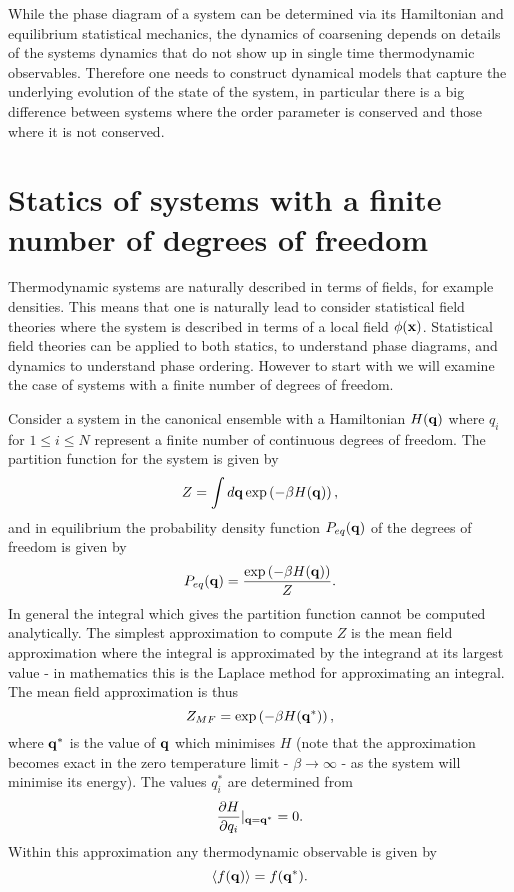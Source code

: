 \documentclass[11pt]{report}
\begin{document}
While the phase diagram of a system can be determined via 
its Hamiltonian and equilibrium statistical mechanics, the dynamics of coarsening depends on details of the systems dynamics that do not show up in single time thermodynamic observables. Therefore one needs to construct dynamical models that capture the underlying evolution of the state of the system, in particular there is a big difference between systems where the order parameter is conserved and those where it is not conserved.

\section{Statics of systems with a finite number of degrees of freedom}

Thermodynamic systems are naturally described in terms of fields, for example densities. This means that one is naturally lead to consider statistical field theories where the system is described in terms of a local field $\phi({\bf x})$. Statistical field theories can be applied to both statics, to understand phase diagrams, and dynamics to understand phase ordering. However to start with we will examine the case of systems with a finite number of degrees of freedom. 

Consider a system in the canonical ensemble with a Hamiltonian $H({\bf q})$ where $q_i$ for 
$1\leq i\leq N$ represent a finite number of continuous degrees of freedom. The partition function for the system is given by
\begin{equation}
Z = \int d{\bf q} \exp\left(-\beta H({\bf q})\right),
\end{equation}
and in equilibrium the probability density function $P_{eq}({\bf q})$ of the degrees of freedom is given by 
\begin{equation}
P_{eq}({\bf q}) = \frac{\exp\left(-\beta H({\bf q})\right)}{Z}.\label{eqdis}
\end{equation}
In general the integral which gives the  partition function cannot be computed analytically.
The simplest approximation to compute $Z$ is the mean field approximation where the integral 
is approximated by the integrand at its largest value - in mathematics this is the Laplace method for approximating an integral. The mean field approximation is thus
\begin{equation}
Z_{MF}= \exp\left(-\beta H({\bf q}^*)\right),
\end{equation}
where ${\bf q}^*$ is the value of ${\bf q}$ which minimises $H$ (note that the approximation becomes exact in the zero temperature limit - $\beta \to \infty$   - as the system will minimise its energy). The values $q_i^*$ are determined from
\begin{equation}
\frac{\partial H}{\partial q_i}|_{{\bf q}={\bf q^*}}=0.
\end{equation}
Within this approximation any thermodynamic observable is given by
\begin{equation}
\langle f({\bf q}) \rangle = f({\bf q}^*).
\end{equation}
\end{document}
